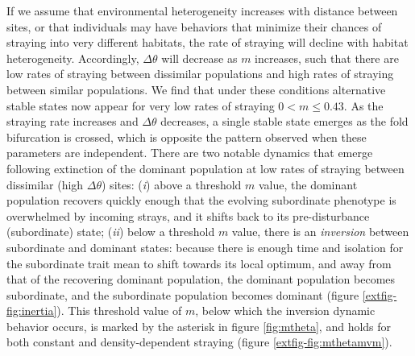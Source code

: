 \documentclass{revtex4}
\begin{document}
If we assume that environmental heterogeneity increases with distance between sites, or that individuals may have behaviors that minimize their chances of straying into very different habitats, the rate of straying will decline with habitat heterogeneity.
Accordingly, $\Delta\theta$ will decrease as $m$ increases, such that there are low rates of straying between dissimilar populations and high rates of straying between similar populations.
We find that under these conditions alternative stable states now appear for very low rates of straying $0 < m \leq 0.43$.
As the straying rate increases and $\Delta\theta$ decreases, a single stable state emerges as the fold bifurcation is crossed, which is opposite the pattern observed when these parameters are independent.
There are two notable dynamics that emerge following extinction of the dominant population at low rates of straying between dissimilar (high $\Delta\theta$) sites:
(\emph{i}) above a threshold $m$ value, the dominant population recovers quickly enough that the evolving subordinate phenotype is overwhelmed by incoming strays, and it shifts back to its pre-disturbance (subordinate) state;
(\emph{ii}) below a threshold $m$ value, there is an \emph{inversion} between subordinate and dominant states: because there is enough time and isolation for the subordinate trait mean to shift towards its local optimum, and away from that of the recovering dominant population, the dominant population becomes subordinate, and the subordinate population becomes dominant (figure \ref{extfig-fig:inertia}).
This threshold value of $m$, below which the inversion dynamic behavior occurs, is marked by the asterisk in figure \ref{fig:mtheta}, and holds for both constant and density-dependent straying (figure \ref{extfig-fig:mthetamvm}).
\end{document}
